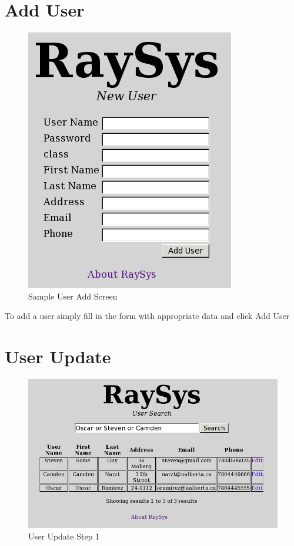 \documentclass[11pt]{report}
\begin{document}
\section*{Add User}
\begin{figure}[htb]
  \begin{center}
    \includegraphics[scale=0.50]{imgs/useradd.png}
    \caption{Sample User Add Screen}
    \label{fig:useraddh}
  \end{center}
\end{figure}

To add a user simply fill in the form with appropriate data and click Add User

\section*{User Update}

\begin{figure}[htb]
  \begin{center}
    \includegraphics[scale=0.50]{imgs/us1.png}
    \caption{User Update Step 1}
    \label{fig:us1}
  \end{center}
\end{figure}
\end{document}
